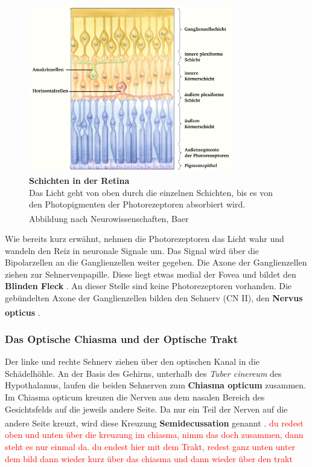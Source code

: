 \documentclass[12pt,a4paper,pdftex]{article}
\begin{document}
\begin{figure}[H]
    \centering
    \includegraphics[width = 0.8\textwidth]{pictures/visual/retina.png}
    \caption[Schichten in der Retina]{\textbf{Schichten in der Retina}\\
    Das Licht geht von oben durch die einzelnen Schichten, bis es von den Photopigmenten der Photorezeptoren absorbiert wird. Abbildung nach Neurowissenschaften, Baer \textsuperscript{\cite[10]{neurowissenschaften_baer}}}
    \label{fig:retina}
\end{figure}

Wie bereits kurz erwähnt, nehmen die Photorezeptoren das Licht wahr und wandeln den Reiz in neuronale Signale um. Das Signal wird über die Bipolarzellen an die Ganglienzellen weiter gegeben. Die Axone der Ganglienzellen ziehen zur Sehnervenpapille. Diese liegt etwas medial der Fovea und bildet den \textbf{Blinden Fleck} . An dieser Stelle sind keine Photorezeptoren vorhanden. Die gebündelten Axone der Ganglienzellen bilden den Sehnerv (CN II), den \textbf{Nervus opticus} \textsuperscript{\cite[15]{crossman2014neuroanatomy}}.  


\subsubsection*{Das Optische Chiasma und der Optische Trakt}

Der linke und rechte Sehnerv ziehen über den optischen Kanal in die Schädelhöhle. An der Basis des Gehirns, unterhalb des \textit{Tuber cinereum} des Hypothalamus, laufen die beiden Sehnerven zum \textbf{Chiasma opticum}  zusammen. 
Im Chiasma opticum kreuzen die Nerven aus dem nasalen Bereich des Gesichtsfelds auf die jeweils andere Seite. Da nur ein Teil der Nerven auf die andere Seite kreuzt, wird diese Kreuzung \textbf{Semidecussation}  genannt \textsuperscript{\cite[15]{crossman2014neuroanatomy}}. \textcolor{red}{du redest oben und unten über die kreuzung im chiasma, nimm das doch zusammen, dann steht es nur einmal da. du endest hier mit dem Trakt, redest ganz unten unter dem bild dann wieder kurz über das chiasma und dann wieder über den trakt}
\end{document}
